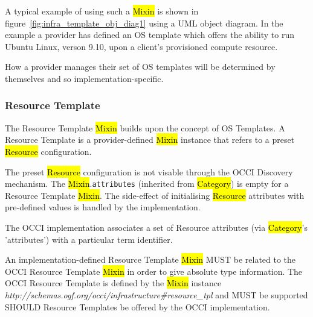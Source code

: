 \documentclass[10pt,a4paper]{article}
\begin{document}
A typical example of using such a \hl{Mixin} is shown in
figure~\ref{fig:infra_template_obj_diag1} using a UML object diagram.
%
In the example
a provider has defined an OS template which offers the ability to run Ubuntu Linux,
verson 9.10, upon a client's provisioned compute resource.

How a provider manages their set of OS templates will be determined by themselves and so 
implementation-specific.

\subsubsection{Resource Template}
The Resource Template \hl{Mixin} builds upon the concept of OS Templates. A Resource Template is
a provider-defined \hl{Mixin} instance that refers to a preset \hl{Resource} configuration. 

The preset \hl{Resource} configuration is not visable through the OCCI
Discovery mechanism. The \hl{Mixin}.{\tt attributes} (inherited from
\hl{Category}) is empty for a Resource Template \hl{Mixin}.
The side-effect of initialising \hl{Resource} attributes with pre-defined
values is handled by the implementation.

The OCCI implementation associates a set of Resource attributes (via \hl{Category}'s 'attributes') with 
a particular term identifier. 

An implementation-defined Resource Template \hl{Mixin} MUST be related 
to the OCCI Resource Template \hl{Mixin} in order to give absolute type information.
%
The OCCI Resource Template is defined by the \hl{Mixin} instance
\textit{http://schemas.ogf.org/occi/infrastructure\#resource\_tpl} and MUST be 
supported SHOULD Resource Templates be offered by the OCCI implementation.
\end{document}
